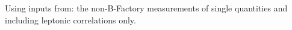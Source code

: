 \noindent Using inputs from: the non-B-Factory measurements of single quantities and including leptonic correlations only.

